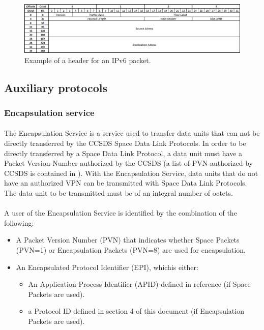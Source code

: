 \documentclass[12pt,a4paper]{report}
\begin{document}
\begin{figure}[H]
\begin{center}
\includegraphics[scale=0.6]{IPv6_header.PNG}
\caption[IPv6 header]{Example of a header for an IPv6 packet.}
\label{fig:IPv6header}
\end{center}
\end{figure}

\subsection{Auxiliary protocols}

\subsubsection{Encapsulation service\cite{ES}}
\paragraph{}The Encapsulation Service is a service used to transfer data units that can not be directly transferred by the CCSDS Space Data Link Protocols. In order to be directly transferred by a Space Data Link Protocol, a data unit must have a Packet Version Number authorized by the CCSDS (a list of PVN authorized by CCSDS is contained in \cite{SANAPVN}). With the Encapsulation Service, data units that do not have an authorized VPN can be transmitted with Space Data Link Protocols. The data unit to be transmitted must be of an integral number of octets.
\paragraph{}A user of the Encapsulation Service is identified by the combination of the following:
\begin{itemize}
\item A Packet Version Number (PVN) that indicates whether Space Packets (PVN=1) or Encapsulation Packets (PVN=8) are used for encapsulation,
\item An Encapsulated Protocol Identifier (EPI), whichis either:
\begin{itemize}
\item An Application Process Identifier (APID) defined in reference (if Space Packets are used).
\item a Protocol ID defined in section 4 of this document (if Encapsulation Packets are used).
\end{itemize}
\end{itemize}
\end{document}
